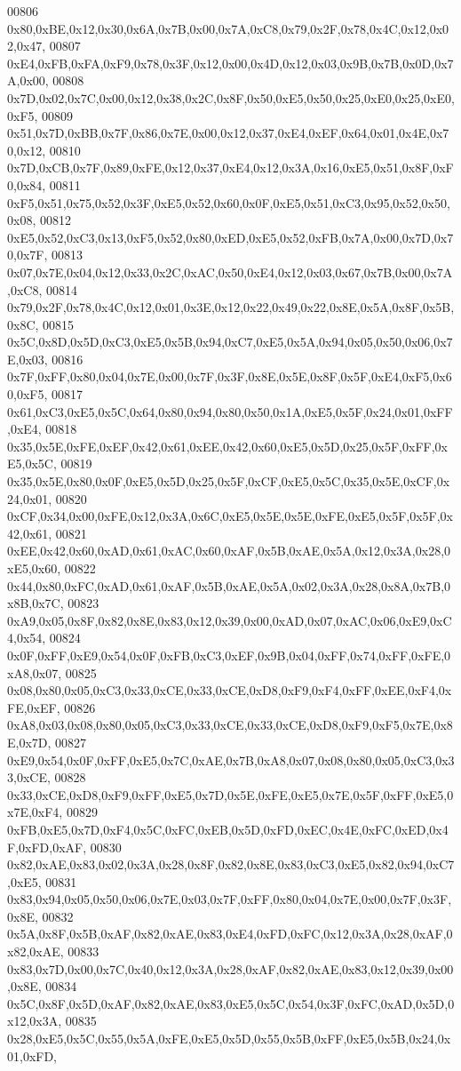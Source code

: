 \begin{DoxyCode}
00806 0x80,0xBE,0x12,0x30,0x6A,0x7B,0x00,0x7A,0xC8,0x79,0x2F,0x78,0x4C,0x12,0x02,0x47,
00807 0xE4,0xFB,0xFA,0xF9,0x78,0x3F,0x12,0x00,0x4D,0x12,0x03,0x9B,0x7B,0x0D,0x7A,0x00,
00808 0x7D,0x02,0x7C,0x00,0x12,0x38,0x2C,0x8F,0x50,0xE5,0x50,0x25,0xE0,0x25,0xE0,0xF5,
00809 0x51,0x7D,0xBB,0x7F,0x86,0x7E,0x00,0x12,0x37,0xE4,0xEF,0x64,0x01,0x4E,0x70,0x12,
00810 0x7D,0xCB,0x7F,0x89,0xFE,0x12,0x37,0xE4,0x12,0x3A,0x16,0xE5,0x51,0x8F,0xF0,0x84,
00811 0xF5,0x51,0x75,0x52,0x3F,0xE5,0x52,0x60,0x0F,0xE5,0x51,0xC3,0x95,0x52,0x50,0x08,
00812 0xE5,0x52,0xC3,0x13,0xF5,0x52,0x80,0xED,0xE5,0x52,0xFB,0x7A,0x00,0x7D,0x70,0x7F,
00813 0x07,0x7E,0x04,0x12,0x33,0x2C,0xAC,0x50,0xE4,0x12,0x03,0x67,0x7B,0x00,0x7A,0xC8,
00814 0x79,0x2F,0x78,0x4C,0x12,0x01,0x3E,0x12,0x22,0x49,0x22,0x8E,0x5A,0x8F,0x5B,0x8C,
00815 0x5C,0x8D,0x5D,0xC3,0xE5,0x5B,0x94,0xC7,0xE5,0x5A,0x94,0x05,0x50,0x06,0x7E,0x03,
00816 0x7F,0xFF,0x80,0x04,0x7E,0x00,0x7F,0x3F,0x8E,0x5E,0x8F,0x5F,0xE4,0xF5,0x60,0xF5,
00817 0x61,0xC3,0xE5,0x5C,0x64,0x80,0x94,0x80,0x50,0x1A,0xE5,0x5F,0x24,0x01,0xFF,0xE4,
00818 0x35,0x5E,0xFE,0xEF,0x42,0x61,0xEE,0x42,0x60,0xE5,0x5D,0x25,0x5F,0xFF,0xE5,0x5C,
00819 0x35,0x5E,0x80,0x0F,0xE5,0x5D,0x25,0x5F,0xCF,0xE5,0x5C,0x35,0x5E,0xCF,0x24,0x01,
00820 0xCF,0x34,0x00,0xFE,0x12,0x3A,0x6C,0xE5,0x5E,0x5E,0xFE,0xE5,0x5F,0x5F,0x42,0x61,
00821 0xEE,0x42,0x60,0xAD,0x61,0xAC,0x60,0xAF,0x5B,0xAE,0x5A,0x12,0x3A,0x28,0xE5,0x60,
00822 0x44,0x80,0xFC,0xAD,0x61,0xAF,0x5B,0xAE,0x5A,0x02,0x3A,0x28,0x8A,0x7B,0x8B,0x7C,
00823 0xA9,0x05,0x8F,0x82,0x8E,0x83,0x12,0x39,0x00,0xAD,0x07,0xAC,0x06,0xE9,0xC4,0x54,
00824 0x0F,0xFF,0xE9,0x54,0x0F,0xFB,0xC3,0xEF,0x9B,0x04,0xFF,0x74,0xFF,0xFE,0xA8,0x07,
00825 0x08,0x80,0x05,0xC3,0x33,0xCE,0x33,0xCE,0xD8,0xF9,0xF4,0xFF,0xEE,0xF4,0xFE,0xEF,
00826 0xA8,0x03,0x08,0x80,0x05,0xC3,0x33,0xCE,0x33,0xCE,0xD8,0xF9,0xF5,0x7E,0x8E,0x7D,
00827 0xE9,0x54,0x0F,0xFF,0xE5,0x7C,0xAE,0x7B,0xA8,0x07,0x08,0x80,0x05,0xC3,0x33,0xCE,
00828 0x33,0xCE,0xD8,0xF9,0xFF,0xE5,0x7D,0x5E,0xFE,0xE5,0x7E,0x5F,0xFF,0xE5,0x7E,0xF4,
00829 0xFB,0xE5,0x7D,0xF4,0x5C,0xFC,0xEB,0x5D,0xFD,0xEC,0x4E,0xFC,0xED,0x4F,0xFD,0xAF,
00830 0x82,0xAE,0x83,0x02,0x3A,0x28,0x8F,0x82,0x8E,0x83,0xC3,0xE5,0x82,0x94,0xC7,0xE5,
00831 0x83,0x94,0x05,0x50,0x06,0x7E,0x03,0x7F,0xFF,0x80,0x04,0x7E,0x00,0x7F,0x3F,0x8E,
00832 0x5A,0x8F,0x5B,0xAF,0x82,0xAE,0x83,0xE4,0xFD,0xFC,0x12,0x3A,0x28,0xAF,0x82,0xAE,
00833 0x83,0x7D,0x00,0x7C,0x40,0x12,0x3A,0x28,0xAF,0x82,0xAE,0x83,0x12,0x39,0x00,0x8E,
00834 0x5C,0x8F,0x5D,0xAF,0x82,0xAE,0x83,0xE5,0x5C,0x54,0x3F,0xFC,0xAD,0x5D,0x12,0x3A,
00835 0x28,0xE5,0x5C,0x55,0x5A,0xFE,0xE5,0x5D,0x55,0x5B,0xFF,0xE5,0x5B,0x24,0x01,0xFD,

\end{DoxyCode}
